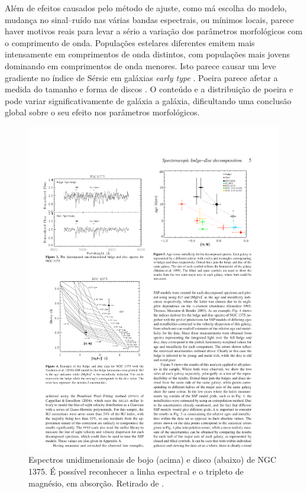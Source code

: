 Além de efeitos causados pelo método de ajuste, como má escolha do modelo,
mudança no sinal--ruído nas várias bandas espectrais, ou mínimos locais, parece
haver motivos reais para levar a sério a variação dos parâmetros morfológicos
com o comprimento de onda. Populações estelares diferentes emitem mais
intensamente em comprimentos de onda distintos, com populações mais jovens
dominando em comprimentos de onda menores.
Isto parece causar um leve gradiente no índice de Sérsic em galáxias {\em early
type} \citep{LaBarbera2009}. Poeira parece afetar a medida do tamanho e forma de
discos \citep{Mollenhoff2006}. O conteúdo e a distribuição de poeira e pode
variar significativamente de galáxia a galáxia, dificultando uma conclusão
global sobre o seu efeito nos parâmetros morfológicos.

\begin{figure}
	\includegraphics{figuras/johnston-spectra}
	\caption[Espectros das componentes morfológicas.] {Espectros unidimensionais de
	bojo (acima) e disco (abaixo) de NGC 1375. É possível reconhecer a
	linha espectral \Hbeta e o tripleto de magnésio, em absorção. Retirado de
	\citet{Johnston2012}.}
	\label{fig:spectraJohnston}
\end{figure}

